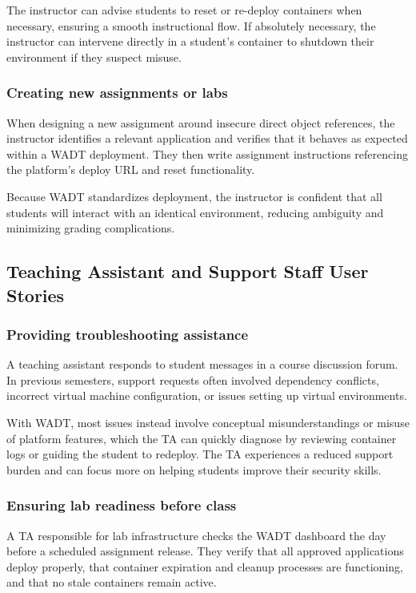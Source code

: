 \documentclass[12pt,titlepage]{article}
\begin{document}
The instructor can advise students to reset or re-deploy containers when necessary, ensuring a smooth instructional flow. If absolutely necessary, the instructor can intervene directly in a student’s container to shutdown their environment if they suspect misuse.

\subsubsection*{Creating new assignments or labs}
When designing a new assignment around insecure direct object references, the instructor identifies a relevant application and verifies that it behaves as expected within a WADT deployment. They then write assignment instructions referencing the platform’s deploy URL and reset functionality.

Because WADT standardizes deployment, the instructor is confident that all students will interact with an identical environment, reducing ambiguity and minimizing grading complications.

\subsection{Teaching Assistant and Support Staff User Stories}

\subsubsection*{Providing troubleshooting assistance}
A teaching assistant responds to student messages in a course discussion forum. In previous semesters, support requests often involved dependency conflicts, incorrect virtual machine configuration, or issues setting up virtual environments.

With WADT, most issues instead involve conceptual misunderstandings or misuse of platform features, which the TA can quickly diagnose by reviewing container logs or guiding the student to redeploy. The TA experiences a reduced support burden and can focus more on helping students improve their security skills.

\subsubsection*{Ensuring lab readiness before class}
A TA responsible for lab infrastructure checks the WADT dashboard the day before a scheduled assignment release. They verify that all approved applications deploy properly, that container expiration and cleanup processes are functioning, and that no stale containers remain active.
\end{document}
